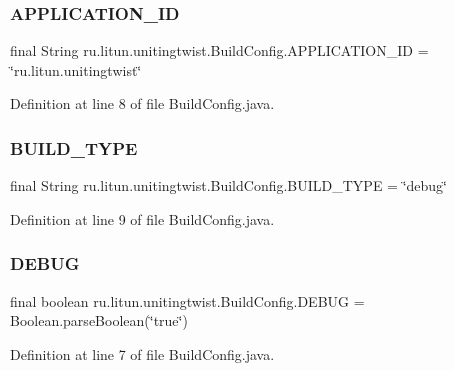 \subsubsection{A\+P\+P\+L\+I\+C\+A\+T\+I\+O\+N\+\_\+\+ID}
{\footnotesize\ttfamily final String ru.\+litun.\+unitingtwist.\+Build\+Config.\+A\+P\+P\+L\+I\+C\+A\+T\+I\+O\+N\+\_\+\+ID = \char`\"{}ru.\+litun.\+unitingtwist\char`\"{}\hspace{0.3cm}{\ttfamily [static]}}



Definition at line 8 of file Build\+Config.\+java.

\mbox{\label{classru_1_1litun_1_1unitingtwist_1_1_build_config_ae00b14c4211500960df5c9e98a134cad}} 
\subsubsection{B\+U\+I\+L\+D\+\_\+\+T\+Y\+PE}
{\footnotesize\ttfamily final String ru.\+litun.\+unitingtwist.\+Build\+Config.\+B\+U\+I\+L\+D\+\_\+\+T\+Y\+PE = \char`\"{}debug\char`\"{}\hspace{0.3cm}{\ttfamily [static]}}



Definition at line 9 of file Build\+Config.\+java.

\mbox{\label{classru_1_1litun_1_1unitingtwist_1_1_build_config_a1a9f2c2ce0cb35f0bf3f4e4b1397dd25}} 
\subsubsection{D\+E\+B\+UG}
{\footnotesize\ttfamily final boolean ru.\+litun.\+unitingtwist.\+Build\+Config.\+D\+E\+B\+UG = Boolean.\+parse\+Boolean(\char`\"{}true\char`\"{})\hspace{0.3cm}{\ttfamily [static]}}



Definition at line 7 of file Build\+Config.\+java.

